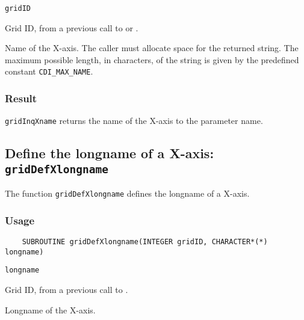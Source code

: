 \hspace*{4mm}\begin{minipage}[]{15cm}
\begin{deflist}{\tt gridID\ }
\item[{\tt gridID}]
Grid ID, from a previous call to {} or {}.
\item[{\tt name}]
Name of the X-axis. The caller must allocate space for the
                    returned string. The maximum possible length, in characters, of
                    the string is given by the predefined constant {\tt CDI\_MAX\_NAME}.

\end{deflist}
\end{minipage}

\subsubsection*{Result}

{\tt gridInqXname} returns the name of the X-axis to the parameter name.



\subsection{Define the longname of a X-axis: {\tt gridDefXlongname}}
\label{gridDefXlongname}

The function {\tt gridDefXlongname} defines the longname of a X-axis.

\subsubsection*{Usage}

\begin{verbatim}
    SUBROUTINE gridDefXlongname(INTEGER gridID, CHARACTER*(*) longname)
\end{verbatim}

\hspace*{4mm}\begin{minipage}[]{15cm}
\begin{deflist}{\tt longname\ }
\item[{\tt gridID}]
Grid ID, from a previous call to {}.
\item[{\tt longname}]
Longname of the X-axis.

\end{deflist}
\end{minipage}


